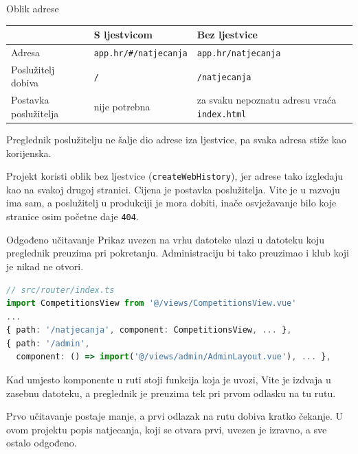\begin{frame}{Oblik adrese}
\vspace{0.2em}
\begin{center}
{\small
\setlength{\tabcolsep}{6pt}
\renewcommand{\arraystretch}{1.3}
\begin{tabular}{@{}L{3.0cm}L{3.9cm}L{4.3cm}@{}}
  \toprule
   & \textbf{S ljestvicom} & \textbf{Bez ljestvice} \\
  \midrule
  Adresa & \texttt{app.hr/\#/natjecanja} & \texttt{app.hr/natjecanja} \\
  Poslužitelj dobiva & \texttt{/} & \texttt{/natjecanja} \\
  Postavka poslužitelja & nije potrebna & za svaku nepoznatu adresu vraća \texttt{index.html} \\
  \bottomrule
\end{tabular}
}
\end{center}

\vspace{0.6em}
Preglednik poslužitelju ne šalje dio adrese iza ljestvice, pa svaka adresa stiže kao korijenska.

\vspace{0.4em}
Projekt koristi oblik bez ljestvice (\texttt{createWebHistory}), jer adrese tako izgledaju kao na svakoj drugoj stranici. Cijena je postavka poslužitelja. Vite je u razvoju ima sam, a poslužitelj u produkciji je mora dobiti, inače osvježavanje bilo koje stranice osim početne daje \texttt{404}.
\end{frame}

\begin{frame}[fragile]{Odgođeno učitavanje}
Prikaz uvezen na vrhu datoteke ulazi u datoteku koju preglednik preuzima pri pokretanju. Administraciju bi tako preuzimao i klub koji je nikad ne otvori.

\begin{lstlisting}[language=typescript]
// src/router/index.ts
import CompetitionsView from '@/views/CompetitionsView.vue'
...
{ path: '/natjecanja', component: CompetitionsView, ... },
{ path: '/admin',
  component: () => import('@/views/admin/AdminLayout.vue'), ... },
\end{lstlisting}

\vspace{0.2em}
Kad umjesto komponente u ruti stoji funkcija koja je uvozi, Vite je izdvaja u zasebnu datoteku, a preglednik je preuzima tek pri prvom odlasku na tu rutu.

\vspace{0.2em}
Prvo učitavanje postaje manje, a prvi odlazak na rutu dobiva kratko čekanje. U ovom projektu popis natjecanja, koji se otvara prvi, uvezen je izravno, a sve ostalo odgođeno.
\end{frame}

